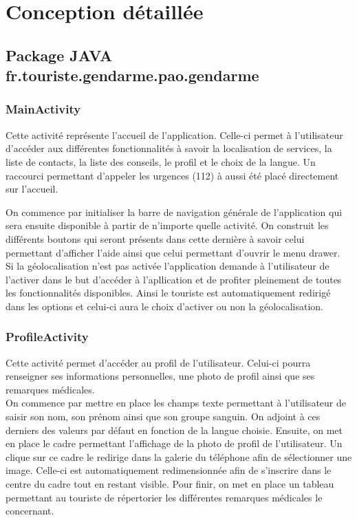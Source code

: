 \section{Conception détaillée}

\subsection{Package JAVA fr.touriste.gendarme.pao.gendarme}
	
\subsubsection{MainActivity}
	
	Cette activité représente l'accueil de l'application. Celle-ci permet à l'utilisateur d'accéder aux différentes fonctionnalités à savoir la localisation de services, la liste de contacts, la liste des conseils, le profil et le choix de la langue. Un raccourci permettant d'appeler les urgences (112) à aussi été placé directement sur l'accueil.
	
	On commence par initialiser la barre de navigation générale de l'application qui sera ensuite disponible à partir de n'importe quelle activité. On construit les différents boutons qui seront présents dans cette dernière à savoir celui permettant d'afficher l'aide ainsi que celui permettant d'ouvrir le menu drawer.
	\\
	
	Si la géolocalisation n'est pas activée l'application demande à l'utilisateur de l'activer dans le but d'accéder à l'apllication et de profiter pleinement de toutes les fonctionnalités disponibles. Ainsi le touriste est automatiquement redirigé dans les options et celui-ci aura le choix d'activer ou non la géolocalisation.
	
\subsubsection{ProfileActivity}
	
	Cette activité permet d'accéder au profil de l'utilisateur. Celui-ci pourra renseigner ses informations personnelles, une photo de profil ainsi que ses remarques médicales.
	\\
	
	On commence par mettre en place les champs texte permettant à l'utilisateur de saisir son nom, son prénom ainsi que son groupe sanguin. On adjoint à ces derniers des valeurs par défaut en fonction de la langue choisie. Ensuite, on met en place le cadre permettant l'affichage de la photo de profil de l'utilisateur. Un clique sur ce cadre le redirige dans la galerie du téléphone afin de sélectionner une image. Celle-ci est automatiquement redimensionnée afin de s'inscrire dans le centre du cadre tout en restant visible. Pour finir, on met en place un tableau permettant au touriste de répertorier les différentes remarques médicales le concernant.
	\\
	
